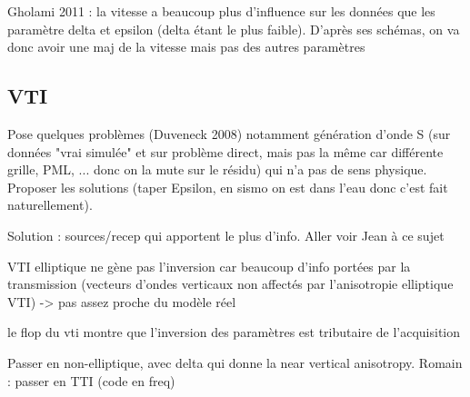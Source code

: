 Gholami 2011 : la vitesse a beaucoup plus d'influence sur les données que les paramètre delta et epsilon (delta étant le plus faible). D'après ses schémas, on va donc avoir une maj de la vitesse mais pas des autres paramètres

\subsection{VTI}
Pose quelques problèmes (Duveneck 2008) notamment génération d'onde S (sur données "vrai simulée"  et sur problème direct, mais pas la même car différente grille, PML, ... donc on la mute sur le résidu) qui n'a pas de sens physique. Proposer les solutions (taper Epsilon, en sismo on est dans l'eau donc c'est fait naturellement).


Solution : sources/recep qui apportent le plus d'info. Aller voir Jean à ce sujet


VTI elliptique ne gène pas l'inversion car beaucoup d'info portées par la transmission (vecteurs d'ondes verticaux non affectés par l'anisotropie elliptique VTI)  -> pas assez proche du modèle réel

le flop du vti montre que l'inversion des paramètres est tributaire de l'acquisition

Passer en non-elliptique, avec delta qui donne la near vertical anisotropy. Romain : passer en TTI (code en freq)

